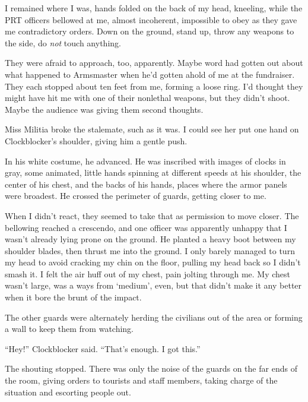 





I remained where I was, hands folded on the back of my head, kneeling, while the PRT officers bellowed at me, almost incoherent, impossible to obey as they gave me contradictory orders.  Down on the ground, stand up, throw any weapons to the side, do \emph{not} touch anything.



They were afraid to approach, too, apparently.  Maybe word had gotten out about what happened to Armsmaster when he'd gotten ahold of me at the fundraiser.  They each stopped about ten feet from me, forming a loose ring.  I'd thought they might have hit me with one of their nonlethal weapons, but they didn't shoot.  Maybe the audience was giving them second thoughts.



Miss Militia broke the stalemate, such as it was.  I could see her put one hand on Clockblocker's shoulder, giving him a gentle push.



In his white costume, he advanced.  He was inscribed with images of clocks in gray, some animated, little hands spinning at different speeds at his shoulder, the center of his chest, and the backs of his hands, places where the armor panels were broadest.  He crossed the perimeter of guards, getting closer to me.



When I didn't react, they seemed to take that as permission to move closer.  The bellowing reached a crescendo, and one officer was apparently unhappy that I wasn't already lying prone on the ground.  He planted a heavy boot between my shoulder blades, then thrust me into the ground.  I only barely managed to turn my head to avoid cracking my chin on the floor, pulling my head back so I didn't smash it.  I felt the air huff out of my chest, pain jolting through me.  My chest wasn't large, was a ways from `medium', even, but that didn't make it any better when it bore the brunt of the impact.



The other guards were alternately herding the civilians out of the area or forming a wall to keep them from watching.



``Hey!'' Clockblocker said.  ``That's enough.  I got this.''



The shouting stopped.  There was only the noise of the guards on the far ends of the room, giving orders to tourists and staff members, taking charge of the situation and escorting people out.



